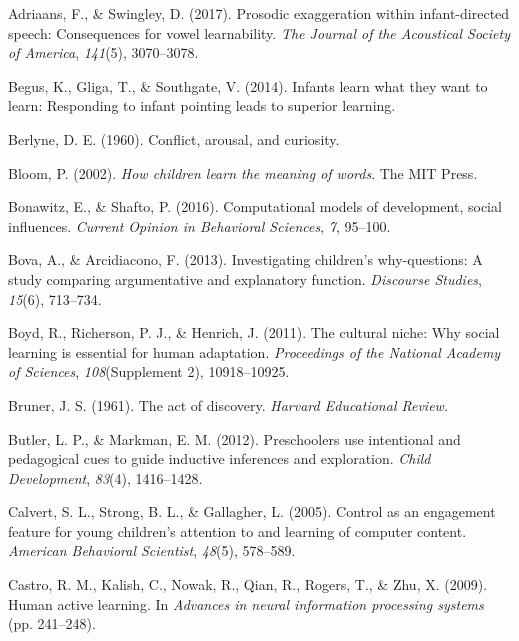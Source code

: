 \documentclass[a4paper,man,apacite,floatsintext]{apa6}
\begin{document}
\setlength{\parindent}{-0.4in} \setlength{\leftskip}{0.125in} \noindent

\hypertarget{refs}{}
\hypertarget{ref-adriaans2017prosodic}{}
Adriaans, F., \& Swingley, D. (2017). Prosodic exaggeration within
infant-directed speech: Consequences for vowel learnability. \emph{The
Journal of the Acoustical Society of America}, \emph{141}(5),
3070--3078.

\hypertarget{ref-begus2014infants}{}
Begus, K., Gliga, T., \& Southgate, V. (2014). Infants learn what they
want to learn: Responding to infant pointing leads to superior learning.

\hypertarget{ref-berlyne1960conflict}{}
Berlyne, D. E. (1960). Conflict, arousal, and curiosity.

\hypertarget{ref-bloom2002children}{}
Bloom, P. (2002). \emph{How children learn the meaning of words}. The
MIT Press.

\hypertarget{ref-bonawitz2016computational}{}
Bonawitz, E., \& Shafto, P. (2016). Computational models of development,
social influences. \emph{Current Opinion in Behavioral Sciences},
\emph{7}, 95--100.

\hypertarget{ref-bova2013investigating}{}
Bova, A., \& Arcidiacono, F. (2013). Investigating children's
why-questions: A study comparing argumentative and explanatory function.
\emph{Discourse Studies}, \emph{15}(6), 713--734.

\hypertarget{ref-boyd2011cultural}{}
Boyd, R., Richerson, P. J., \& Henrich, J. (2011). The cultural niche:
Why social learning is essential for human adaptation. \emph{Proceedings
of the National Academy of Sciences}, \emph{108}(Supplement 2),
10918--10925.

\hypertarget{ref-bruner1961act}{}
Bruner, J. S. (1961). The act of discovery. \emph{Harvard Educational
Review}.

\hypertarget{ref-butler2012preschoolers}{}
Butler, L. P., \& Markman, E. M. (2012). Preschoolers use intentional
and pedagogical cues to guide inductive inferences and exploration.
\emph{Child Development}, \emph{83}(4), 1416--1428.

\hypertarget{ref-calvert2005control}{}
Calvert, S. L., Strong, B. L., \& Gallagher, L. (2005). Control as an
engagement feature for young children's attention to and learning of
computer content. \emph{American Behavioral Scientist}, \emph{48}(5),
578--589.

\hypertarget{ref-castro2009human}{}
Castro, R. M., Kalish, C., Nowak, R., Qian, R., Rogers, T., \& Zhu, X.
(2009). Human active learning. In \emph{Advances in neural information
processing systems} (pp. 241--248).
\end{document}

